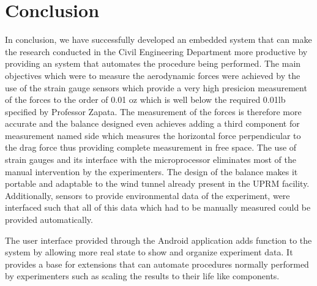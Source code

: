 \section{Conclusion}
	
	In conclusion, we have successfully developed an embedded system that can make the research conducted in the Civil Engineering Department more productive by providing an system that automates the procedure being performed. The main objectives which were to measure the aerodynamic forces were achieved by the use of the strain gauge sensors which provide a very high presicion measurement of the forces to the order of 0.01 oz which is well below the required 0.01lb specified by Professor Zapata. The measurement of the forces is therefore more accurate and the balance designed even achieves adding a third component for measurement named side which measures the horizontal force perpendicular to the drag force thus providing complete measurement in free space. The use of strain gauges and its interface with the microprocessor eliminates most of the manual intervention by the experimenters. The design of the balance makes it portable and adaptable to the wind tunnel already present in the UPRM facility. Additionally, sensors to provide environmental data of the experiment, were interfaced such that all of this data which had to be manually measured could be provided automatically.

	The user interface provided through the Android application adds function to the system by allowing more real state to show and organize experiment data. It provides a base for extensions that can automate procedures normally performed by experimenters such as scaling the results to their life like components. 



